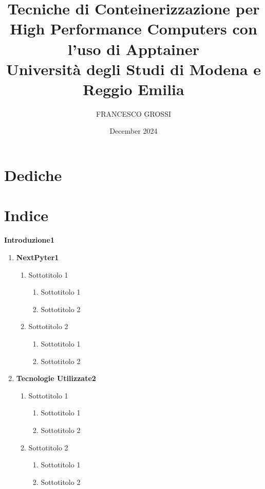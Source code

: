 \documentclass{report}
\title{Tecniche di Conteinerizzazione per High Performance Computers con l'uso di Apptainer\\
{\Large Università degli Studi di Modena e Reggio Emilia}}
\author{FRANCESCO GROSSI}
\date{December 2024}
\begin{document}
\maketitle



\chapter*{Dediche}

\chapter*{Indice}
\textbf{Introduzione\hspace{\fill}1}

\begin{enumerate}[label=\textbf{\arabic*.}]
  \item \textbf{NextPyter\hspace{\fill}1} 
    \begin{enumerate}[label=\arabic{enumi}.\arabic*.]
      \item Sottotitolo 1 \dotfill
      \begin{enumerate}[label=\arabic{enumi}.\arabic{enumii}.\arabic*.]
      \item Sottotitolo 1 \dotfill
      \item Sottotitolo 2 \dotfill
      \end{enumerate}
      \item Sottotitolo 2 \dotfill
      \begin{enumerate}[label=\arabic{enumi}.\arabic{enumii}.\arabic*.]
      \item Sottotitolo 1 \dotfill
      \item Sottotitolo 2 \dotfill
       \end{enumerate}
    \end{enumerate}

\item \textbf{Tecnologie Utilizzate\hspace{\fill}2} 
    \begin{enumerate}[label=\arabic{enumi}.\arabic*.]
      \item Sottotitolo 1 \dotfill
      \begin{enumerate}[label=\arabic{enumi}.\arabic{enumii}.\arabic*.]
      \item Sottotitolo 1 \dotfill
      \item Sottotitolo 2 \dotfill
      \end{enumerate}
      \item Sottotitolo 2 \dotfill
      \begin{enumerate}[label=\arabic{enumi}.\arabic{enumii}.\arabic*.]
      \item Sottotitolo 1 \dotfill
      \item Sottotitolo 2 \dotfill
       \end{enumerate}
    \end{enumerate}
  
\end{enumerate}


\end{document}
